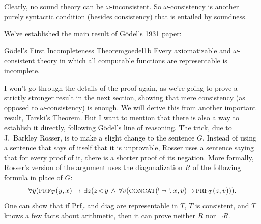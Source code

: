 Clearly, no sound theory can be $\omega$-inconsistent.
So $\omega$-consistency is another purely syntactic condition
(besides consistency)
that is entailed by soundness.

We've established the main result of Gödel's 1931 paper:

\begin{theorem}{Gödel's First Incompleteness Theorem}{goedel1b}
  Every axiomatizable and $\omega$-consistent theory in which
  all computable functions are representable is incomplete.
\end{theorem}

I won't go through the details of the proof again,
as we're going to prove a strictly stronger result in the next section,
showing that mere consistency (as opposed to $\omega$-consistency) is enough.
We will derive this from another important result,
Tarski's Theorem.
But I want to mention that there is also a way to establish it directly,
following Gödel's line of reasoning.
The trick,
due to J.\ Barkley Rosser,
is to make a slight change to the sentence $G$.
Instead of using a sentence that says of itself that it is unprovable,
Rosser uses a sentence saying that
for every proof of it,
there is a shorter proof of its negation.
More formally,
Rosser's version of the argument uses
the diagonalization $R$ of the following formula in place of $G$:
\[
  \forall y(\smallcaps{Prf}_T(y,x) \,\to\, \exists z(z \!< \!y \,\land\, \forall v(\smallcaps{concat}(\gn{\neg},x,v) \to \smallcaps{Prf}_T(z,v))).
\]
One can show that
if $\mathrm{Prf}_T$ and $\mathrm{diag}$ are representable in $T$,
$T$ is consistent, and $T$ knows a few facts about arithmetic,
then it can prove neither $R$ nor $\neg R$.

